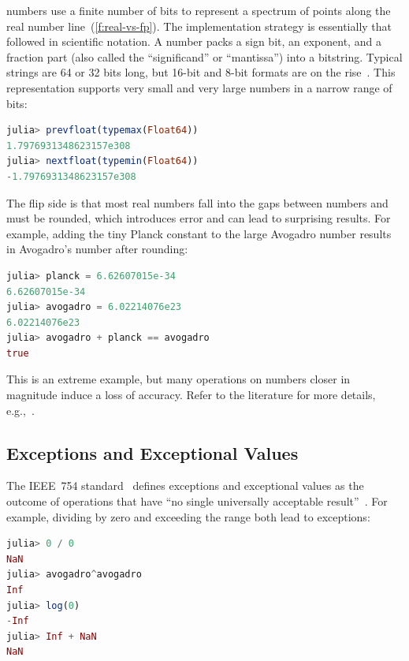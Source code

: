 \documentclass{juliacon}
\begin{document}
\Fp{} numbers use a finite number of bits to represent a spectrum of points along the real number line~(\cref{f:real-vs-fp}).
The implementation strategy is essentially that followed in scientific notation.
A \fp{} number packs a sign bit, an exponent, and a fraction part (also called the ``significand'' or ``mantissa'') into a bitstring.
Typical strings are 64 or 32 bits long, but 16-bit and 8-bit formats are on the rise~\cite{klowerLowprecisionClimateComputing2021,fp8}.
This representation supports very small and very large numbers in a narrow range of bits:

\begin{lstlisting}[language = Julia]
julia> prevfloat(typemax(Float64))
1.7976931348623157e308
julia> nextfloat(typemin(Float64))
-1.7976931348623157e308
\end{lstlisting}

The flip side is that most real numbers fall into the gaps between \fp{} numbers and must be rounded, which introduces error
and can lead to surprising results.
For example, adding the tiny Planck constant to the large Avogadro number results
in Avogadro's number after rounding:

\begin{lstlisting}[language = Julia]
julia> planck = 6.62607015e-34
6.62607015e-34
julia> avogadro = 6.02214076e23
6.02214076e23
julia> avogadro + planck == avogadro
true
\end{lstlisting}

This is an extreme example, but many operations on \fp{} numbers closer in magnitude induce a loss of accuracy.
Refer to the literature for more details, e.g.,~\cite{knuthArtComputerProgramming1997,torontoPracticallyAccurateFloatingPoint2014,mullerHandbookFloatingPointArithmetic2018}.


\subsection{Exceptions and Exceptional Values}
\label{s:exnvalue}

The IEEE~754 \fp{} standard~\cite{IEEEStandardBinary1985}
defines exceptions and exceptional values as the outcome of
operations that have ``no single universally acceptable result''~\cite{p-draft-1997}.
For example, dividing by zero and exceeding the  range
both lead to exceptions:

\begin{lstlisting}[language = Julia]
julia> 0 / 0
NaN
julia> avogadro^avogadro
Inf
julia> log(0)
-Inf
julia> Inf + NaN
NaN
\end{lstlisting}
\end{document}
